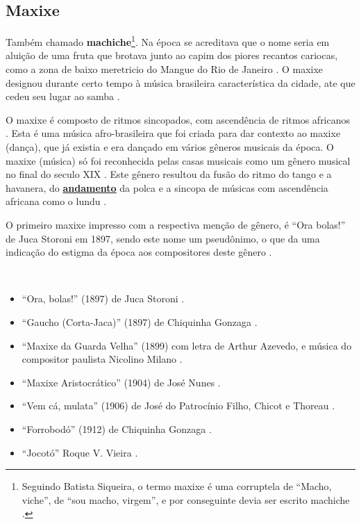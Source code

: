 \subsection{Maxixe}
\label{subsec:maxixe}
Também chamado \textbf{machiche}\footnote{Seguindo Batista Siqueira, 
o termo maxixe é uma corruptela de ``Macho, viche'', 
de ``sou macho, virgem'', e por conseguinte devia ser escrito machiche \cite[pp. 198]{dourado2004dicionario}.}.
Na época se acreditava que o nome seria em aluição de uma fruta que brotava junto ao capim dos piores recantos cariocas,
como a zona de baixo meretricio do Mangue do Rio de Janeiro \cite[pp. 198]{dourado2004dicionario}.
O maxixe designou durante certo tempo à música brasileira característica da cidade, 
ate que cedeu seu lugar ao samba \cite[pp. 4]{musicasambavariasdef1}.

O maxixe é composto de ritmos sincopados, com ascendência de ritmos africanos \cite[pp. 198]{dourado2004dicionario}.
Esta é uma música afro-brasileira \cite[pp. 4]{musicasambavariasdef1} 
que foi criada para dar contexto ao  maxixe (dança), que já existia e era dançado em vários gêneros musicais da época.
O maxixe (música) só foi reconhecida pelas casas musicais como um gênero musical no final do seculo XIX \cite[pp. 465]{marcondes1977enciclopedia}. 
Este gênero resultou da fusão do ritmo do tango e a havanera, 
do \hyperref[sec:Andamento]{\textbf{andamento}} da polca e 
a sincopa de músicas com ascendência africana como o lundu  \cite[pp. 29]{efege1974maxixe}  \cite[pp. 465]{marcondes1977enciclopedia}. 

O primeiro maxixe impresso com a respectiva menção de gênero, é ``Ora bolas!'' de Juca Storoni em 1897,
sendo este nome um pseudônimo, o que da uma indicação do estigma da época aos compositores deste gênero \cite[pp. 80]{sandroni2001feitico} \cite[pp. 108]{efege1974maxixe}.

\begin{example} ~

\begin{itemize}
\item ``Ora, bolas!'' (1897) de Juca Storoni \cite[pp. 108]{efege1974maxixe}.
\item ``Gaucho (Corta-Jaca)'' (1897) de Chiquinha Gonzaga \cite{reportagemtvmaxixe} \cite[pp. 30]{efege1974maxixe}.
\item ``Maxixe da Guarda Velha'' (1899) com letra de Arthur Azevedo, 
e música do compositor paulista Nicolino Milano  \cite{reportagemtvmaxixe}. 
\item ``Maxixe Aristocrático'' (1904) de José Nunes \cite{REIS2003}.
\item ``Vem cá, mulata'' (1906) de José do Patrocínio Filho, Chicot e Thoreau \cite{REIS2003}.
\item ``Forrobodó'' (1912) de Chiquinha Gonzaga \cite{REIS2003} \cite{reportagemtvmaxixe}.
\item ``Jocotó'' Roque V. Vieira \cite{reportagemtvmaxixe}.
\end{itemize}
\end{example}

